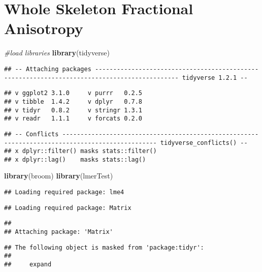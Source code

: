 \documentclass[]{article}
\newenvironment{Shaded}{\begin{snugshade}}{\end{snugshade}}
\newcommand{\KeywordTok}[1]{\textcolor[rgb]{0.13,0.29,0.53}{\textbf{#1}}}
\newcommand{\CommentTok}[1]{\textcolor[rgb]{0.56,0.35,0.01}{\textit{#1}}}
\newcommand{\NormalTok}[1]{#1}
\theoremstyle{definition}
\theoremstyle{definition}
\theoremstyle{definition}
\theoremstyle{remark}
\begin{document}
\section{Whole Skeleton Fractional
Anisotropy}\label{whole-skeleton-fractional-anisotropy}

\begin{Shaded}
\begin{Highlighting}[]
\CommentTok{#load libraries}
\KeywordTok{library}\NormalTok{(tidyverse)}
\end{Highlighting}
\end{Shaded}

\begin{verbatim}
## -- Attaching packages --------------------------------------------------------------------------------------------- tidyverse 1.2.1 --
\end{verbatim}

\begin{verbatim}
## v ggplot2 3.1.0     v purrr   0.2.5
## v tibble  1.4.2     v dplyr   0.7.8
## v tidyr   0.8.2     v stringr 1.3.1
## v readr   1.1.1     v forcats 0.2.0
\end{verbatim}

\begin{verbatim}
## -- Conflicts ------------------------------------------------------------------------------------------------ tidyverse_conflicts() --
## x dplyr::filter() masks stats::filter()
## x dplyr::lag()    masks stats::lag()
\end{verbatim}

\begin{Shaded}
\begin{Highlighting}[]
\KeywordTok{library}\NormalTok{(broom)}
\KeywordTok{library}\NormalTok{(lmerTest)}
\end{Highlighting}
\end{Shaded}

\begin{verbatim}
## Loading required package: lme4
\end{verbatim}

\begin{verbatim}
## Loading required package: Matrix
\end{verbatim}

\begin{verbatim}
## 
## Attaching package: 'Matrix'
\end{verbatim}

\begin{verbatim}
## The following object is masked from 'package:tidyr':
## 
##     expand
\end{verbatim}
\end{document}
